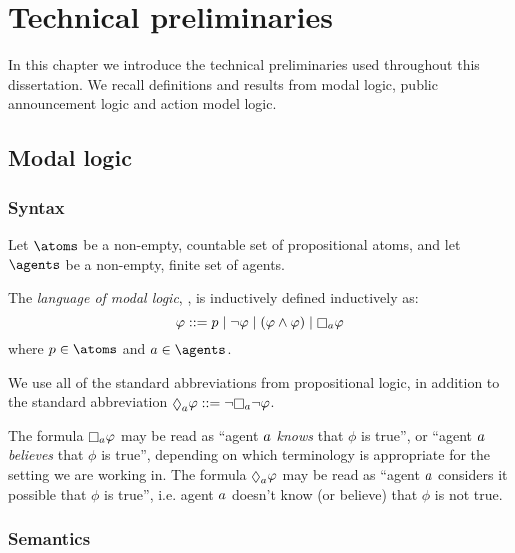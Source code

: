 \chapter{Technical preliminaries}

In this chapter we introduce the technical preliminaries used throughout this dissertation.
We recall definitions and results from modal logic, public announcement logic and action model logic.

\section{Modal logic}

\subsection{Syntax}

Let $\atoms$ be a non-empty, countable set of propositional atoms, and
let $\agents$ be a non-empty, finite set of agents.

\begin{definition}
The {\em language of modal logic}, \langMl{}, is inductively defined inductively as:
$$
\phi ::= 
    \atomP \mid
    \lnot \phi \mid
    (\phi \land \phi) \mid
    \necessary[\agentA] \phi
$$
where $\atomP \in \atoms$ and $\agentA \in \agents$.
\end{definition}

We use all of the standard abbreviations from propositional logic, in addition to the standard abbreviation $\possible[\agentA] \phi ::= \lnot \necessary[\agentA] \lnot \phi$.

The formula $\necessary[\agentA] \phi$ may be read as ``agent $a$ {\em knows} that $\phi$ is true'', or ``agent $a$ {\em believes} that $\phi$ is true'', depending on which terminology is appropriate for the setting we are working in.
The formula $\possible[\agentA] \phi$ may be read as ``agent $a$ considers it possible that $\phi$ is true'', i.e. agent $a$ doesn't know (or believe) that $\phi$ is not true.

\subsection{Semantics}

